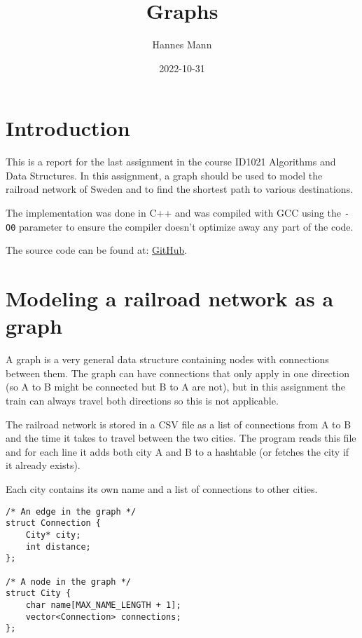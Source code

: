 \documentclass[a4paper,11pt]{article}
\begin{document}
\title{
    \textbf{Graphs}
}
\author{Hannes Mann}
\date{2022-10-31}

\maketitle

\section*{Introduction}

This is a report for the last assignment in the course ID1021 Algorithms and Data Structures.
In this assignment, a graph should be used to model the railroad network of Sweden and to find the shortest path to various destinations.

The implementation was done in C++ and was compiled with GCC using the {\tt -O0} parameter to ensure the compiler doesn't optimize away any part of the code.

The source code can be found at: \href{https://github.com/hannesmann/ID1021/tree/6701e8f191ca4f62e3bd1ddb16cfa4cc649011c9/src/graph38807}{GitHub}.

\section*{Modeling a railroad network as a graph}

A graph is a very general data structure containing nodes with connections between them.
The graph can have connections that only apply in one direction (so A to B might be connected but B to A are not),
but in this assignment the train can always travel both directions so this is not applicable.

The railroad network is stored in a CSV file as a list of connections from A to B and the time it takes to travel between the two cities.
The program reads this file and for each line it adds both city A and B to a hashtable (or fetches the city if it already exists).

Each city contains its own name and a list of connections to other cities.

\begin{verbatim}
/* An edge in the graph */
struct Connection {
	City* city;
	int distance;
};

/* A node in the graph */
struct City {
	char name[MAX_NAME_LENGTH + 1];
	vector<Connection> connections;
};
\end{verbatim}
\end{document}
